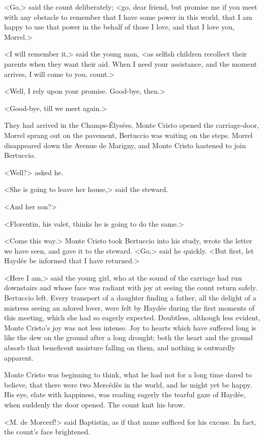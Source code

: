  <Go,> said the count deliberately; <go, dear friend, but promise me if you meet with any obstacle to remember that I have some power in this world, that I am happy to use that power in the behalf of those I love, and that I love you, Morrel.>

<I will remember it,> said the young man, <as selfish children recollect their parents when they want their aid. When I need your assistance, and the moment arrives, I will come to you, count.> 

 <Well, I rely upon your promise. Good-bye, then.> 

 <Good-bye, till we meet again.> 

 They had arrived in the Champs-Élysées. Monte Cristo opened the carriage-door, Morrel sprang out on the pavement, Bertuccio was waiting on the steps. Morrel disappeared down the Avenue de Marigny, and Monte Cristo hastened to join Bertuccio. 

 <Well?> asked he. 

 <She is going to leave her house,> said the steward. 

 <And her son?> 

 <Florentin, his valet, thinks he is going to do the same.> 

 <Come this way.> Monte Cristo took Bertuccio into his study, wrote the letter we have seen, and gave it to the steward. <Go,> said he quickly. <But first, let Haydée be informed that I have returned.> 

 <Here I am,> said the young girl, who at the sound of the carriage had run downstairs and whose face was radiant with joy at seeing the count return safely. Bertuccio left. Every transport of a daughter finding a father, all the delight of a mistress seeing an adored lover, were felt by Haydée during the first moments of this meeting, which she had so eagerly expected. Doubtless, although less evident, Monte Cristo's joy was not less intense. Joy to hearts which have suffered long is like the dew on the ground after a long drought; both the heart and the ground absorb that beneficent moisture falling on them, and nothing is outwardly apparent. 

 Monte Cristo was beginning to think, what he had not for a long time dared to believe, that there were two Mercédès in the world, and he might yet be happy. His eye, elate with happiness, was reading eagerly the tearful gaze of Haydée, when suddenly the door opened. The count knit his brow. 

 <M. de Morcerf!> said Baptistin, as if that name sufficed for his excuse. In fact, the count's face brightened. 

